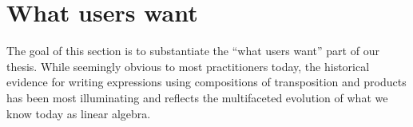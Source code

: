 \section{What users want}

The goal of this section is to substantiate the ``what users want'' part of our thesis. While seemingly obvious to most practitioners today, the historical evidence for writing expressions using compositions of transposition and products has been most illuminating and reflects the multifaceted evolution of what we know today as linear algebra.